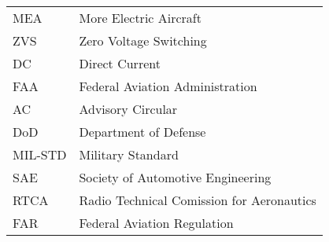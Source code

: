 \begin{longtable}{ll}
MEA			&			More Electric Aircraft\\	
ZVS			&			Zero Voltage Switching\\
DC 			&			Direct Current \\
FAA			&			Federal Aviation Administration\\
AC			&			Advisory Circular\\
DoD			&			Department of Defense\\
MIL-STD		&			Military Standard\\
SAE			&			Society of Automotive Engineering\\
RTCA		&			Radio Technical Comission for Aeronautics\\
FAR			&			Federal Aviation Regulation\\
\end{longtable}

